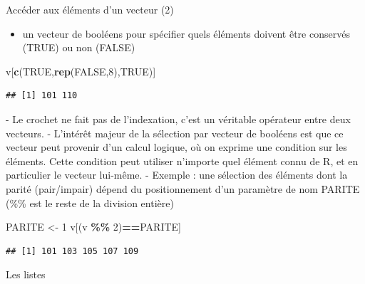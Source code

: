 \documentclass[
  ignorenonframetext,
]{beamer}
\newenvironment{Shaded}{\begin{snugshade}}{\end{snugshade}}
\newcommand{\ConstantTok}[1]{\textcolor[rgb]{0.56,0.35,0.01}{#1}}
\newcommand{\DecValTok}[1]{\textcolor[rgb]{0.00,0.00,0.81}{#1}}
\newcommand{\FunctionTok}[1]{\textcolor[rgb]{0.13,0.29,0.53}{\textbf{#1}}}
\newcommand{\NormalTok}[1]{#1}
\newcommand{\OtherTok}[1]{\textcolor[rgb]{0.56,0.35,0.01}{#1}}
\newcommand{\SpecialCharTok}[1]{\textcolor[rgb]{0.81,0.36,0.00}{\textbf{#1}}}
\providecommand{\tightlist}{%
  \setlength{\itemsep}{0pt}\setlength{\parskip}{0pt}}
\begin{document}
\begin{frame}[fragile]{Accéder aux éléments d'un vecteur (2)}
\protect\hypertarget{accuxe9der-aux-uxe9luxe9ments-dun-vecteur-2}{}
\begin{itemize}
\tightlist
\item
  un vecteur de booléens pour spécifier quels éléments doivent être
  conservés (TRUE) ou non (FALSE)
\end{itemize}

\tiny

\begin{Shaded}
\begin{Highlighting}[]
\NormalTok{v[}\FunctionTok{c}\NormalTok{(}\ConstantTok{TRUE}\NormalTok{,}\FunctionTok{rep}\NormalTok{(}\ConstantTok{FALSE}\NormalTok{,}\DecValTok{8}\NormalTok{),}\ConstantTok{TRUE}\NormalTok{)]}
\end{Highlighting}
\end{Shaded}

\begin{verbatim}
## [1] 101 110
\end{verbatim}

\normalsize - Le crochet ne fait pas de l'indexation, c'est un véritable
opérateur entre deux vecteurs. - L'intérêt majeur de la sélection par
vecteur de booléens est que ce vecteur peut provenir d'un calcul
logique, où on exprime une condition sur les éléments. Cette condition
peut utiliser n'importe quel élément connu de R, et en particulier le
vecteur lui-même. - Exemple : une sélection des éléments dont la parité
(pair/impair) dépend du positionnement d'un paramètre de nom PARITE
(\%\% est le reste de la division entière)

\tiny

\begin{Shaded}
\begin{Highlighting}[]
\NormalTok{PARITE }\OtherTok{\textless{}{-}} \DecValTok{1}
\NormalTok{v[(v }\SpecialCharTok{\%\%} \DecValTok{2}\NormalTok{)}\SpecialCharTok{==}\NormalTok{PARITE]}
\end{Highlighting}
\end{Shaded}

\begin{verbatim}
## [1] 101 103 105 107 109
\end{verbatim}

\normalsize
\end{frame}

\begin{frame}{Les listes}
\protect\hypertarget{les-listes}{}
\end{frame}
\end{document}
